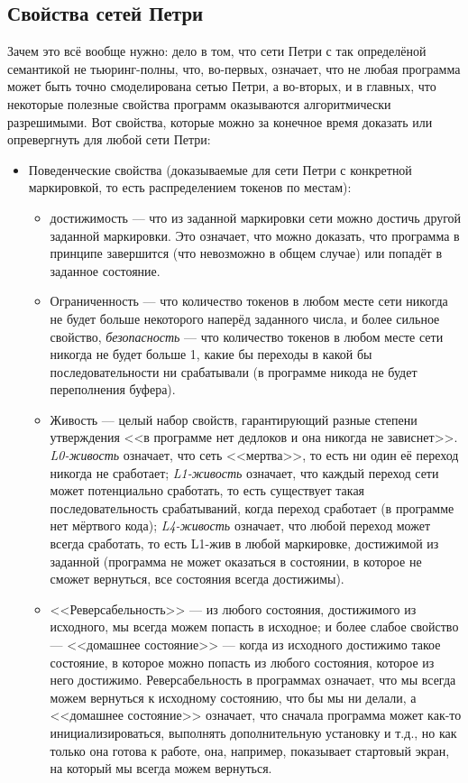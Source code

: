 \documentclass[a5paper]{article}
\begin{document}
\subsection{Свойства сетей Петри}

Зачем это всё вообще нужно: дело в том, что сети Петри с так определёной семантикой не тьюринг-полны, что, во-первых, означает, что не любая программа может быть точно смоделирована сетью Петри, а во-вторых, и в главных, что некоторые полезные свойства программ оказываются алгоритмически разрешимыми. Вот свойства, которые можно за конечное время доказать или опревергнуть для любой сети Петри:

\begin{itemize}
    \item Поведенческие свойства (доказываемые для сети Петри с конкретной маркировкой, то есть распределением токенов по местам):
    \begin{itemize}
        \item достижимость --- что из заданной маркировки сети можно достичь другой заданной маркировки. Это означает, что можно доказать, что программа в принципе завершится (что невозможно в общем случае) или попадёт в заданное состояние.
        \item Ограниченность --- что количество токенов в любом месте сети никогда не будет больше некоторого наперёд заданного числа, и более сильное свойство, \textit{безопасность} --- что количество токенов в любом месте сети никогда не будет больше 1, какие бы переходы в какой бы последовательности ни срабатывали (в программе никода не будет переполнения буфера).
        \item Живость --- целый набор свойств, гарантирующий разные степени утверждения <<в программе нет дедлоков и она никогда не зависнет>>. \textit{L0-живость} означает, что сеть <<мертва>>, то есть ни один её переход никогда не сработает; \textit{L1-живость} означает, что каждый переход сети может потенциально сработать, то есть существует такая последовательность срабатываний, когда переход сработает (в программе нет мёртвого кода); \textit{L4-живость} означает, что любой переход может всегда сработать, то есть L1-жив в любой маркировке, достижимой из заданной (программа не может оказаться в состоянии, в которое не сможет вернуться, все состояния всегда достижимы).
        \item <<Реверсабельность>> --- из любого состояния, достижимого из исходного, мы всегда можем попасть в исходное; и более слабое свойство --- <<домашнее состояние>> --- когда из исходного достижимо такое состояние, в которое можно попасть из любого состояния, которое из него достижимо. Реверсабельность в программах означает, что мы всегда можем вернуться к исходному состоянию, что бы мы ни делали, а <<домашнее состояние>> означает, что сначала программа может как-то инициализироваться, выполнять дополнительную установку и т.д., но как только она готова к работе, она, например, показывает стартовый экран, на который мы всегда можем вернуться.

\end{itemize}
\end{itemize}
\end{document}
